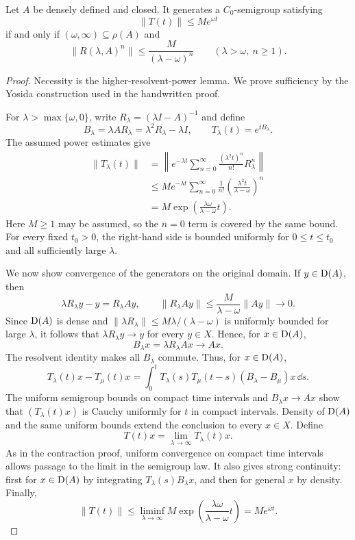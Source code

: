 \begin{notetheorem}
Let $A$ be densely defined and closed.  It generates a $C_0$-semigroup
satisfying
\[
  \|T(t)\|\le Me^{\omega t}
\]
if and only if $(\omega,\infty)\subseteq\rho(A)$ and
\[
  \|R(\lambda,A)^n\|
  \le\frac{M}{(\lambda-\omega)^n}
  \qquad(\lambda>\omega,\ n\ge1).
\]
\end{notetheorem}

\begin{proof}
Necessity is the higher-resolvent-power lemma.  We prove sufficiency by the
Yosida construction used in the handwritten proof.

For $\lambda>\max\{\omega,0\}$, write
$R_\lambda=(\lambda I-A)^{-1}$ and define
\[
  B_\lambda
  =\lambda AR_\lambda
  =\lambda^2R_\lambda-\lambda I,
  \qquad
  T_\lambda(t)=e^{tB_\lambda}.
\]
The assumed power estimates give
\[
\begin{aligned}
  \|T_\lambda(t)\|
   &=\left\|e^{-\lambda t}
       \sum_{n=0}^\infty\frac{(\lambda^2t)^n}{n!}R_\lambda^n\right\|\\
   &\le M e^{-\lambda t}
       \sum_{n=0}^\infty
       \frac1{n!}\left(\frac{\lambda^2t}{\lambda-\omega}\right)^n\\
   &=M\exp\left(\frac{\lambda\omega}{\lambda-\omega}t\right).
\end{aligned}
\]
Here $M\ge1$ may be assumed, so the $n=0$ term is covered by the same bound.
For every fixed $t_0>0$, the right-hand side is bounded uniformly for
$0\le t\le t_0$ and all sufficiently large $\lambda$.

We now show convergence of the generators on the original domain.  If
$y\in\operatorname{D}(A)$, then
\[
  \lambda R_\lambda y-y=R_\lambda Ay,
  \qquad
  \|R_\lambda Ay\|
  \le\frac{M}{\lambda-\omega}\|Ay\|\longrightarrow0.
\]
Since $\operatorname{D}(A)$ is dense and
$\|\lambda R_\lambda\|\le M\lambda/(\lambda-\omega)$ is uniformly bounded
for large $\lambda$, it follows that
$\lambda R_\lambda y\to y$ for every $y\in X$.  Hence, for
$x\in\operatorname{D}(A)$,
\[
  B_\lambda x=\lambda R_\lambda Ax\longrightarrow Ax.
\]
The resolvent identity makes all $B_\lambda$ commute.  Thus, for
$x\in\operatorname{D}(A)$,
\[
  T_\lambda(t)x-T_\mu(t)x
  =\int_0^t
     T_\lambda(s)T_\mu(t-s)(B_\lambda-B_\mu)x\,\dd s.
\]
The uniform semigroup bounds on compact time intervals and
$B_\lambda x\to Ax$ show that $(T_\lambda(t)x)$ is Cauchy uniformly for
$t$ in compact intervals.  Density of $\operatorname{D}(A)$ and the same uniform bounds
extend the conclusion to every $x\in X$.  Define
\[
  T(t)x=\lim_{\lambda\to\infty}T_\lambda(t)x.
\]
As in the contraction proof, uniform convergence on compact time intervals
allows passage to the limit in the semigroup law.  It also gives strong
continuity: first for $x\in\operatorname{D}(A)$ by integrating $T_\lambda(s)B_\lambda x$,
and then for general $x$ by density.  Finally,
\[
  \|T(t)\|
  \le\liminf_{\lambda\to\infty}
      M\exp\left(\frac{\lambda\omega}{\lambda-\omega}t\right)
  =Me^{\omega t}.
\]


\end{proof}
